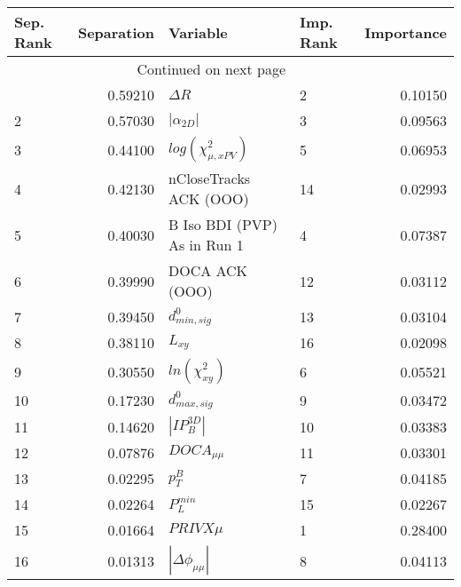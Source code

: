 \usepackage{lscape}

\begin{landscape}
\begin{longtable}{lrllr}
\toprule
Sep. Rank &  Separation &                     Variable & Imp. Rank &  Importance \\
\midrule
\endhead
\midrule
\multicolumn{3}{r}{{Continued on next page}} \\
\midrule
\endfoot

\bottomrule
\endlastfoot
        1 &     0.59210 &                   $\Delta R$ &         2 &     0.10150 \\
        2 &     0.57030 &              $|\alpha_{2D}|$ &         3 &     0.09563 \\
        3 &     0.44100 &    $log(\chi^{2}_{\mu,xPV})$ &         5 &     0.06953 \\
        4 &     0.42130 &       nCloseTracks ACK (OOO) &        14 &     0.02993 \\
        5 &     0.40030 &  B Iso BDI (PVP) As in Run 1 &         4 &     0.07387 \\
        6 &     0.39990 &               DOCA ACK (OOO) &        12 &     0.03112 \\
        7 &     0.39450 &             $d^0_{min, sig}$ &        13 &     0.03104 \\
        8 &     0.38110 &                     $L_{xy}$ &        16 &     0.02098 \\
        9 &     0.30550 &          $ln(\chi^{2}_{xy})$ &         6 &     0.05521 \\
       10 &     0.17230 &             $d^0_{max, sig}$ &         9 &     0.03472 \\
       11 &     0.14620 &              $|IP_{B}^{3D}|$ &        10 &     0.03383 \\
       12 &     0.07876 &              $DOCA_{\mu\mu}$ &        11 &     0.03301 \\
       13 &     0.02295 &                    $p^B_{T}$ &         7 &     0.04185 \\
       14 &     0.02264 &                $P^{min}_{L}$ &        15 &     0.02267 \\
       15 &     0.01664 &                   $PRIVX\mu$ &         1 &     0.28400 \\
       16 &     0.01313 &     $|\Delta \phi_{\mu\mu}|$ &         8 &     0.04113 \\
\end{longtable}

\end{landscape}
